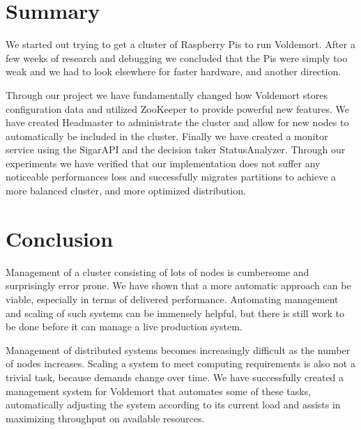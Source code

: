 \section{Summary}
We started out trying to get a cluster of Raspberry Pis to run Voldemort. After a few weeks of research and debugging we concluded that the Pis were simply too weak and we had to look elsewhere for faster hardware, and another direction.

Through our project we have fundamentally changed how Voldemort stores configuration data and utilized ZooKeeper to provide powerful new features. We have created Headmaster to administrate the cluster and allow for new nodes to automatically be included in the cluster. Finally we have created a monitor service using the SigarAPI and the decision taker StatusAnalyzer. Through our experiments we have verified that our implementation does not suffer any noticeable performances loss and successfully migrates partitions to achieve a more balanced cluster, and more optimized distribution. 

\section{Conclusion}
Management of a cluster consisting of lots of nodes is cumbersome and surprisingly error prone. We have shown that a more automatic approach can be viable, especially in terms of delivered performance. Automating management and scaling of such systems can be immensely helpful, but there is still work to be done before it can manage a live production system.

Management of distributed systems becomes increasingly difficult as the number of nodes increases. Scaling a system to meet computing requirements is also not a trivial task, because demands change over time. We have successfully created a management system for Voldemort that automates some of these tasks, automatically adjusting the system according to its current load and assists in maximizing throughput on available resources.
